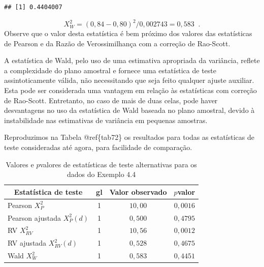 \documentclass[]{book}
\numberwithin{example}{chapter}
\numberwithin{remark}{chapter}
\numberwithin{definition}{chapter}
\begin{document}
\begin{verbatim}
## [1] 0.4404007
\end{verbatim}

\[
X_{W}^{2}=\left( 0,84-0,80\right) ^{2}/0,002743=0,583\;\;\mbox{.} 
\] Observe que o valor desta estatística é bem próximo dos valores das
estatísticas de Pearson e da Razão de Verossimilhança com a correção de
Rao-Scott.

A estatística de Wald, pelo uso de uma estimativa apropriada da
variância, reflete a complexidade do plano amostral e fornece uma
estatística de teste assintoticamente válida, não necessitando que seja
feito qualquer ajuste auxiliar. Esta pode ser considerada uma vantagem
em relação às estatísticas com correção de Rao-Scott. Entretanto, no
caso de mais de duas celas, pode haver desvantagens no uso da
estatística de Wald baseada no plano amostral, devido à instabilidade
nas estimativas de variância em pequenas amostras.

Reproduzimos na Tabela @ref\{tab72\} os resultados para todas as
estatísticas de teste consideradas até agora, para facilidade de
comparação.

\begin{center}
\begin{table}[tbp] \centering%
\caption{Valores e $p$valores de estatísticas de teste alternativas para os
dados do Exemplo 4.4}\bigskip \label{tab72} 
\begin{tabular}{|c|c|c|c|}
\hline\hline
Estatística de teste & gl & Valor observado & $p$valor \\ \hline\hline
\multicolumn{1}{|l|}{Pearson $X_{P}^{2}$} & 1 & $10,00$ & $0,0016$ \\ 
\multicolumn{1}{|l|}{Pearson ajustada $X_{P}^{2}\left( d\right)$} & 1 & $%
0,500$ & $0,4795$ \\ 
\multicolumn{1}{|l|}{RV $X_{RV}^{2}$} & 1 & $10,56$ & $0,0012$ \\ 
\multicolumn{1}{|l|}{RV ajustada $X_{RV}^{2}(d)$} & 1 & $0,528$ & $0,4675$
\\ 
\multicolumn{1}{|l|}{Wald $X_{W}^{2}$} & 1 & $0,583$ & $0,4451$ \\ 
\hline\hline
\end{tabular}
\end{table}%
\end{center}
\end{document}
